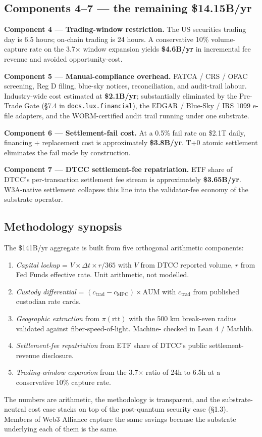 \subsection{Components 4--7 --- the remaining \$14.15B/yr}

\textbf{Component 4 --- Trading-window restriction.} The US securities
trading day is 6.5 hours; on-chain trading is 24 hours. A conservative
10\% volume-capture rate on the 3.7$\times$ window expansion yields
\textbf{\$4.6B/yr} in incremental fee revenue and avoided
opportunity-cost.

\textbf{Component 5 --- Manual-compliance overhead.} FATCA / CRS /
OFAC screening, Reg D filing, blue-sky notices, reconciliation, and
audit-trail labour. Industry-wide cost estimated at \textbf{\$2.1B/yr};
substantially eliminated by the Pre-Trade Gate (\S 7.4 in
\texttt{docs.lux.financial}), the EDGAR / Blue-Sky / IRS 1099 e-file
adapters, and the WORM-certified audit trail running under one
substrate.

\textbf{Component 6 --- Settlement-fail cost.} At a 0.5\% fail rate on
\$2.1T daily, financing + replacement cost is approximately
\textbf{\$3.8B/yr}. T+0 atomic settlement eliminates the fail mode by
construction.

\textbf{Component 7 --- DTCC settlement-fee repatriation.} ETF share
of DTCC's per-transaction settlement fee stream is approximately
\textbf{\$3.65B/yr}. W3A-native settlement collapses this line into the
validator-fee economy of the substrate operator.

\subsection{Methodology synopsis}

The \$141B/yr aggregate is built from five orthogonal arithmetic
components:

\begin{enumerate}[leftmargin=2em,itemsep=0.1em]
\item \emph{Capital lockup} = $V \times \Delta t \times r/365$ with
$V$ from DTCC reported volume, $r$ from Fed Funds effective rate.
Unit arithmetic, not modelled.
\item \emph{Custody differential} = $(c_{\text{trad}} - c_{\text{MPC}})
\times \text{AUM}$ with $c_{\text{trad}}$ from published custodian rate
cards.
\item \emph{Geographic extraction} from $\pi(\text{rtt})$ with the 500 km
break-even radius validated against fiber-speed-of-light. Machine-
checked in Lean 4 / Mathlib.
\item \emph{Settlement-fee repatriation} from ETF share of DTCC's
public settlement-revenue disclosure.
\item \emph{Trading-window expansion} from the 3.7$\times$ ratio of 24h
to 6.5h at a conservative 10\% capture rate.
\end{enumerate}

The numbers are arithmetic, the methodology is transparent, and the
substrate-neutral cost case stacks on top of the post-quantum security
case (\S 1.3). Members of Web3 Alliance capture the same savings
because the substrate underlying each of them is the same.
